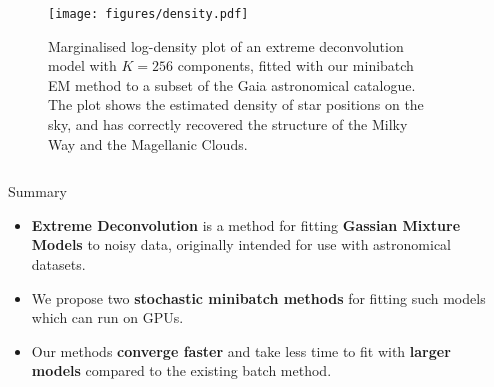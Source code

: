\documentclass[final]{beamer}
\newlength{\sepwidth}
\newlength{\colwidth}
\newlength{\doublewidth}
\newcommand{\separatorcolumn}{\begin{column}{\sepwidth}\end{column}}
\begin{document}
\begin{frame}[t]

\begin{columns}[t]

\separatorcolumn
\begin{column}{\doublewidth}
\vspace{-3ex}
\begin{figure}
        \centering
        \texttt{[image: figures/density.pdf]}
        \caption{Marginalised log-density plot of an extreme deconvolution model with $K=256$ components, fitted with our minibatch EM method to a subset of the Gaia astronomical catalogue. The plot shows the estimated density of star positions on the sky, and has correctly recovered the structure of the Milky Way and the Magellanic Clouds.}
\end{figure}
\vspace*{2ex}
\end{column}

\separatorcolumn

\end{columns}

\begin{columns}[t]
\separatorcolumn

\begin{column}{\colwidth}
    
    \begin{alertblock}{Summary}
        \begin{itemize} 
            \item \textbf{Extreme Deconvolution} is a method for fitting \textbf{Gassian Mixture Models} to noisy data, originally intended for use with astronomical datasets.
            \item We propose two \textbf{stochastic minibatch methods} for fitting such models which can run on GPUs. 
            \item Our methods \textbf{converge faster} and take less time to fit with \textbf{larger models} compared to the existing batch method.
        \end{itemize}
    \end{alertblock}
    

\end{column}
\end{columns}
\end{frame}
\end{document}
